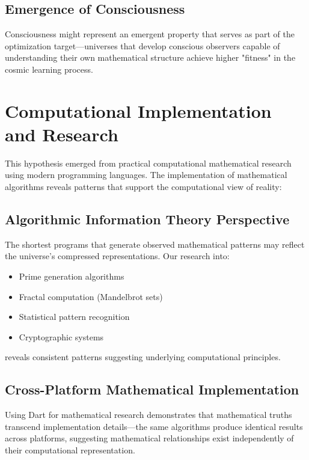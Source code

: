 \documentclass[12pt]{article}
\begin{document}
\subsection{Emergence of Consciousness}

Consciousness might represent an emergent property that serves as part of the optimization target—universes that develop conscious observers capable of understanding their own mathematical structure achieve higher "fitness" in the cosmic learning process.

\section{Computational Implementation and Research}

This hypothesis emerged from practical computational mathematical research using modern programming languages. The implementation of mathematical algorithms reveals patterns that support the computational view of reality:

\subsection{Algorithmic Information Theory Perspective}

The shortest programs that generate observed mathematical patterns may reflect the universe's compressed representations. Our research into:

\begin{itemize}
\item Prime generation algorithms
\item Fractal computation (Mandelbrot sets)
\item Statistical pattern recognition
\item Cryptographic systems
\end{itemize}

reveals consistent patterns suggesting underlying computational principles.

\subsection{Cross-Platform Mathematical Implementation}

Using Dart for mathematical research demonstrates that mathematical truths transcend implementation details—the same algorithms produce identical results across platforms, suggesting mathematical relationships exist independently of their computational representation.
\end{document}

